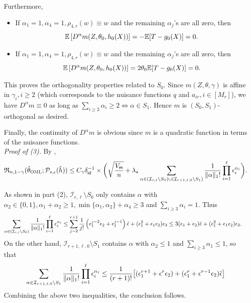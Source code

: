 \documentclass{article}
\def\eps{{\epsilon}}
\def\gI{{\mathcal{I}}}
\def\gP{{\mathcal{P}}}
\newcommand{\E}{\mathbb{E}}
\newcommand{\oml}{\textsc{OML}}
\begin{document}
Furthermore,
\begin{itemize}
    \item If $\alpha_1=1,\alpha_{4}=1, \rho_{4,r}(w)\equiv w $ and the remaining $\alpha_j$'s are all zero, then
    \begin{equation}
        \notag
        \E\left[D^{\alpha}m(Z,\theta_0,h_0(X))\right] = -\E[T-g_0(X)] = 0.
    \end{equation}
    \item If $\alpha_1=1,\alpha_{4}=1, \rho_{4,r}(w)\equiv w $ and the remaining $\alpha_j$'s are all zero, then
    \begin{equation}
        \notag
        \E\left[D^{\alpha}m(Z,\theta_0,h_0(X))\right] = 2\theta_0\E[T-g_0(X)] = 0.
    \end{equation}
\end{itemize}
This proves the orthogonality properties related to $S_0$. Since $m(Z,\theta,\gamma)$ is affine in $\gamma_i, i\geq 2$ (which corresponds to the nuisance functions $q$ and $a_{ir}, i\in[M_r]$), we have $D^\alpha m \equiv 0$ as long as $\sum_{i\geq 2}\alpha_i \geq 2 \Leftrightarrow \alpha\in S_1$. Hence $m$ is $(S_0,S_1)$-orthogonal as desired.

Finally, the continuity of $D^{\alpha}m$ is obvious since $m$ is a quadratic function in terms of the nuisance functions.
\\

\textit{Proof of (3).} By ,
\begin{equation}
    \mathfrak{R}_{n,1-\gamma} (\hat{\theta}_{\oml};\gP_{s,\eps}(\hat{h})) \leq C_{\gamma}\delta_{\mathsf{id}}^{-1}\times
    \bigg(\sqrt{\frac{V_{\mathsf{m}}}{n}}  + \lambda_{\star}\sum_{\alpha\in  (\gI_{r,\ell}\setminus S_0)\cup (\gI_{r+1,\ell,0}\setminus S_1)} \frac{1}{\|\alpha\|_1!} \prod_{i=1}^\ell \eps_i^{\alpha_i} \bigg).
\end{equation}

As shown in part (2), $\gI_{r,\ell}\setminus S_0$ only contains $\alpha$ with $\alpha_2\in\{0,1\}, \alpha_1+\alpha_2\geq 1, \min\{\alpha_1,\alpha_2\}+\alpha_4\geq 3$ and $\sum_{i\geq 3}\alpha_i=1$. Thus
\begin{equation}
    \notag
    \begin{aligned}
        \sum_{\alpha\in  (\gI_{r,\ell}\setminus S_0)} \frac{1}{\|\alpha\|_1!} \prod_{i=1}^\ell \eps_i^{\alpha_i} &\leq \sum_{j=2}^{r+1}\frac{1}{j!}\left(\eps_1^{j-2}\eps_2+\eps_1^{j-1}\right)\tilde{\eps} + (\eps_1^2+\eps_1\eps_2)\eps_3 \leq 3(\eps_1+\eps_2)\tilde{\eps}+ (\eps_1^2+\eps_1\eps_2)\eps_3. 
    \end{aligned}
\end{equation}
On the other hand, $\gI_{r+1,\ell,0}\setminus S_1$ contains $\alpha$ with $\alpha_2\leq 1$ and $\sum_{i\geq 3}\alpha_1\leq 1$, so that
\begin{equation}
    \notag
    \sum_{\alpha\in \gI_{r+1,\ell,0}\setminus S_1} \frac{1}{\|\alpha\|_1!} \prod_{i=1}^\ell \eps_i^{\alpha_i} \leq \frac{1}{(r+1)!}\big[ (\eps_1^{r+1}+\eps^r\eps_2) +  (\eps_1^{r}+\eps^{r-1}\eps_2)\tilde{\eps} \big]
\end{equation}
Combining the above two inequalities, the conclusion follows.
\end{document}
